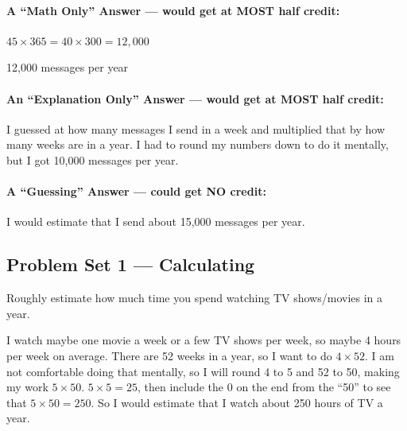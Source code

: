 \documentclass[12pt]{ximera}
\begin{document}
\paragraph{A ``Math Only'' Answer --- would get at MOST half credit:}
$45 \times 365 = 40 \times 300 = 12{,}000$

12,000 messages per year

\paragraph{An ``Explanation Only'' Answer --- would get at MOST half credit:}
I guessed at how many messages I send in a week and multiplied that by how many weeks
are in a year. I had to round my numbers down to do it mentally, but I got 10,000
messages per year.

\paragraph{A ``Guessing'' Answer --- could get NO credit:}
I would estimate that I send about 15,000 messages per year.

\subsection*{Problem Set 1 --- Calculating}

\begin{problem}
Roughly estimate how much time you spend watching TV shows/movies in a year.

\begin{freeResponse}
\end{freeResponse}

\begin{solution}
I watch maybe one movie a week or a few TV shows per week, so maybe 4 hours per week on
average. There are 52 weeks in a year, so I want to do $4 \times 52$. I am not
comfortable doing that mentally, so I will round 4 to 5 and 52 to 50, making my work
$5 \times 50$. $5 \times 5 = 25$, then include the 0 on the end from the ``50'' to see
that $5 \times 50 = 250$. So I would estimate that I watch about 250 hours of TV a year.
\end{solution}
\end{problem}
\end{document}
